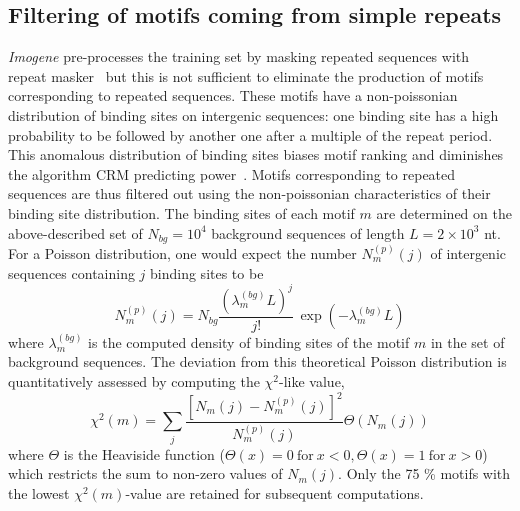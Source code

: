 \documentclass[a4,center,fleqn]{NAR}
\begin{document}
\subsection*{Filtering of motifs coming from simple repeats}
{\em Imogene} pre-processes the training set by masking repeated sequences with
repeat masker~\cite{bao2002automated} but this is not sufficient to eliminate
the production of motifs corresponding to repeated sequences.
These motifs have a non-poissonian distribution of binding sites on intergenic
sequences: one binding site has a high probability to be followed by another
one after a multiple of the repeat period.
This anomalous distribution of binding sites biases motif ranking and 
diminishes the algorithm CRM predicting power~\cite{Rouault:2010fk}. 
Motifs corresponding to repeated sequences are thus filtered out using the
non-poissonian characteristics of their binding site distribution.
The binding sites of each motif $m$ are determined on the above-described set
of $N_{bg}=10^4$ background sequences of length $L=2 \times 10^3$ nt.
For a Poisson distribution, one would expect the number $N^{(p)}_m(j)$ of
intergenic sequences containing $j$ binding sites to be
\begin{equation}
N^{(p)}_m(j)=N_{bg} \frac{(\lambda^{(bg)}_m L)^j}{j!}\,
\exp(- \lambda^{(bg)}_m L)
\label{npoi}
\end{equation}
where $\lambda^{(bg)}_m$ is the computed density of binding sites of the motif
$m$ in the set of background sequences.
The deviation from this theoretical Poisson distribution is quantitatively
assessed by computing the $\chi^2$-like value,
\begin{equation}
\chi^2(m)= \sum_j \frac{[N_m(j)-N^{(p)}_m(j)]^2}{N^{(p)}_m(j)}
\Theta(N_m(j))
\end{equation}
where  $\Theta$ is the Heaviside function ($\Theta(x)=0\ \mathrm{for}\ x<0,\Theta(x)=1\ \mathrm{for}\  x>0 $) which restricts the sum to non-zero values of $N_m(j)$. Only the 75 \%
motifs with the lowest $\chi^2(m)$-value
are retained for subsequent computations.
\end{document}
